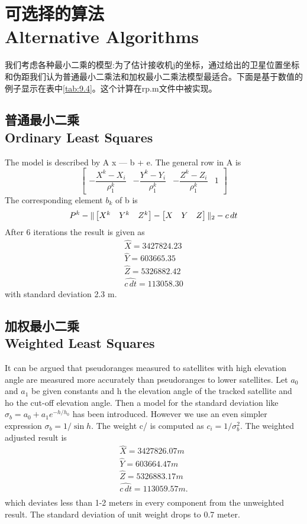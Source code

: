\section[可选择的算法]{可选择的算法\\Alternative Algorithms}
	我们考虑各种最小二乘的模型:为了估计接收机j的坐标，通过给出的卫星位置坐标和伪距我们认为普通最小二乘法和加权最小二乘法模型最适合。下面是基于数值的例子显示在表中\ref{tab:9.4}。这个计算在rp.m文件中被实现。
	\subsection[普通最小二乘]{普通最小二乘\\Ordinary Least Squares}
		The model is described by A x — b + e. The general row in A is
		\[ 
			\begin{bmatrix}
				-\dfrac{X^k-X_i}{\rho^k_1} & -\dfrac{Y^k-Y_i}{\rho^k_1} & -\dfrac{Z^k-Z_i}{\rho^k_1} & 1
			\end{bmatrix} 
		\]
		The corresponding element $b_k$ of b is
		\[
			P^k - \Arrowvert 
			\begin{bmatrix}
			X^k & Y^k & Z^k
			\end{bmatrix}-
			\begin{bmatrix}
			X & Y & Z
			\end{bmatrix}
			\Arrowvert_2
			-c\,dt
		\]
		After 6 iterations the result is given as
		\[
		\begin{split}
		\hat{X} = 3427824.23 \\
		\hat{Y} =  603665.35 \\
		\hat{Z} = 5326882.42 \\
		\hat{c\,dt} =  113058.30
		\end{split}
		\]
		with standard deviation 2.3 m.
	
	\subsection[加权最小二乘]{加权最小二乘\\Weighted Least Squares}
		It can be argued that pseudoranges measured to satellites with high elevation angle are measured more accurately than pseudoranges to lower satellites. Let $a_0$ and $a_1$ be given constants and h the elevation angle of the tracked satellite and ho the cut-off elevation angle. Then a model for the standard deviation like $\sigma_b = a_0 + a_1e^{-h/h_0}$ has been introduced. However we use an even simpler expression $\sigma_b=1/\sin h$. The weight c/ is computed as $c_i=1/\sigma^2_b$. The weighted adjusted result is
		\[
		\begin{split}
			\hat{X} = 3427826.07 m \\
			\hat{Y} =  603664.47 m \\
			\hat{Z} = 5326883.17 m \\
			\hat{c\,dt} = 113059.57 m. \\
		\end{split}
		\]
		which deviates less than 1-2 meters in every component from the unweighted result. The standard deviation of unit weight drops to 0.7 meter.
	
